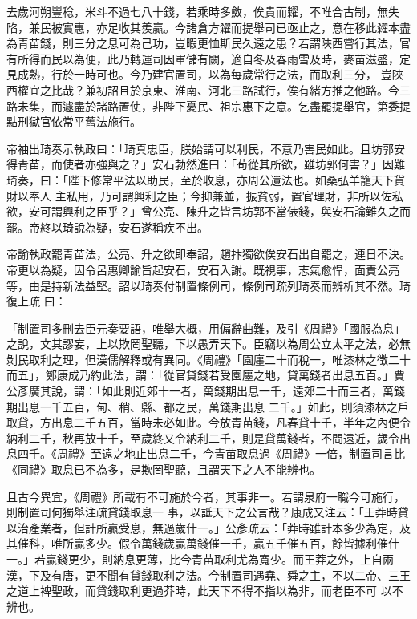 \begin{pinyinscope}
 去歲河朔豐稔，米斗不過七八十錢，若乘時多斂，俟貴而糶，不唯合古制，無失陷，兼民被實惠，亦足收其羨贏。今諸倉方糴而提舉司已亟止之，意在移此糴本盡為青苗錢，則三分之息可為己功，豈暇更恤斯民久遠之患？若謂陜西嘗行其法，官有所得而民以為便，此乃轉運司因軍儲有闕，適自冬及春雨雪及時，麥苗滋盛，定見成熟，行於一時可也。今乃建官置司，以為每歲常行之法，而取利三分，
 豈陜西權宜之比哉？兼初詔且於京東、淮南、河北三路試行，俟有緒方推之他路。今三路未集，而遽盡於諸路置使，非陛下憂民、祖宗惠下之意。乞盡罷提舉官，第委提點刑獄官依常平舊法施行。



 帝袖出琦奏示執政曰：「琦真忠臣，朕始謂可以利民，不意乃害民如此。且坊郭安得青苗，而使者亦強與之？」安石勃然進曰：「茍從其所欲，雖坊郭何害？」因難琦奏，曰：「陛下修常平法以助民，至於收息，亦周公遺法也。如桑弘羊籠天下貨財以奉人
 主私用，乃可謂興利之臣；今抑兼並，振貧弱，置官理財，非所以佐私欲，安可謂興利之臣乎？」曾公亮、陳升之皆言坊郭不當俵錢，與安石論難久之而罷。帝終以琦說為疑，安石遂稱疾不出。



 帝諭執政罷青苗法，公亮、升之欲即奉詔，趙抃獨欲俟安石出自罷之，連日不決。帝更以為疑，因令呂惠卿諭旨起安石，安石入謝。既視事，志氣愈悍，面責公亮等，由是持新法益堅。詔以琦奏付制置條例司，條例司疏列琦奏而辨析其不然。琦復上疏
 曰：



 「制置司多刪去臣元奏要語，唯舉大概，用偏辭曲難，及引《周禮》「國服為息」之說，文其謬妄，上以欺罔聖聽，下以愚弄天下。臣竊以為周公立太平之法，必無剝民取利之理，但漢儒解釋或有異同。《周禮》「園廛二十而稅一，唯漆林之徵二十而五」，鄭康成乃約此法，謂：「從官貸錢若受園廛之地，貸萬錢者出息五百。」賈公彥廣其說，謂：「如此則近郊十一者，萬錢期出息一千，遠郊二十而三者，萬錢期出息一千五百，甸、稍、縣、都之民，萬錢期出息
 二千。」如此，則須漆林之戶取貸，方出息二千五百，當時未必如此。今放青苗錢，凡春貸十千，半年之內便令納利二千，秋再放十千，至歲終又令納利二千，則是貸萬錢者，不問遠近，歲令出息四千。《周禮》至遠之地止出息二千，今青苗取息過《周禮》一倍，制置司言比《同禮》取息已不為多，是欺罔聖聽，且謂天下之人不能辨也。



 且古今異宜，《周禮》所載有不可施於今者，其事非一。若謂泉府一職今可施行，則制置司何獨舉注疏貸錢取息一
 事，以詆天下之公言哉？康成又注云：「王莽時貸以治產業者，但計所贏受息，無過歲什一。」公彥疏云：「莽時雖計本多少為定，及其催科，唯所贏多少。假令萬錢歲贏萬錢催一千，贏五千催五百，餘皆據利催什一。」若贏錢更少，則納息更薄，比今青苗取利尤為寬少。而王莽之外，上自兩漢，下及有唐，更不聞有貸錢取利之法。今制置司遇堯、舜之主，不以二帝、三王之道上裨聖政，而貸錢取利更過莽時，此天下不得不指以為非，而老臣不可
 以不辨也。




\end{pinyinscope}
